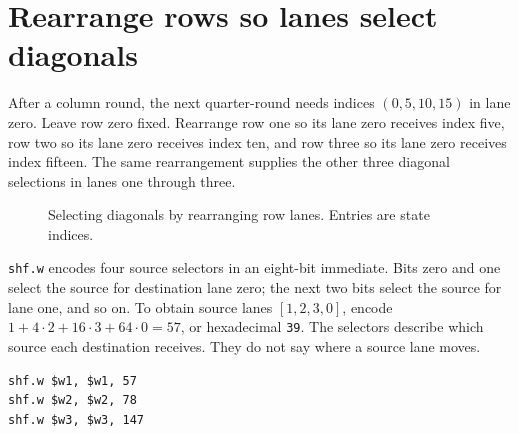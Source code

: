 \section{Rearrange rows so lanes select diagonals}
After a column round, the next quarter-round needs indices \((0,5,10,15)\) in lane
zero. Leave row zero fixed. Rearrange row one so its lane zero receives index five,
row two so its lane zero receives index ten, and row three so its lane zero receives
index fifteen. The same rearrangement supplies the other three diagonal selections
in lanes one through three.

\begin{figure}[htbp]\centering
  \caption{Selecting diagonals by rearranging row lanes. Entries are state indices.}
\end{figure}

\texttt{shf.w} encodes four source selectors in an eight-bit immediate. Bits zero
and one select the source for destination lane zero; the next two bits select the
source for lane one, and so on. To obtain source lanes \([1,2,3,0]\), encode
\(1+4\cdot2+16\cdot3+64\cdot0=57\), or hexadecimal \texttt{39}.
The selectors describe which source each destination receives. They do not say
where a source lane moves.
\begin{verbatim}
shf.w $w1, $w1, 57
shf.w $w2, $w2, 78
shf.w $w3, $w3, 147
\end{verbatim}

